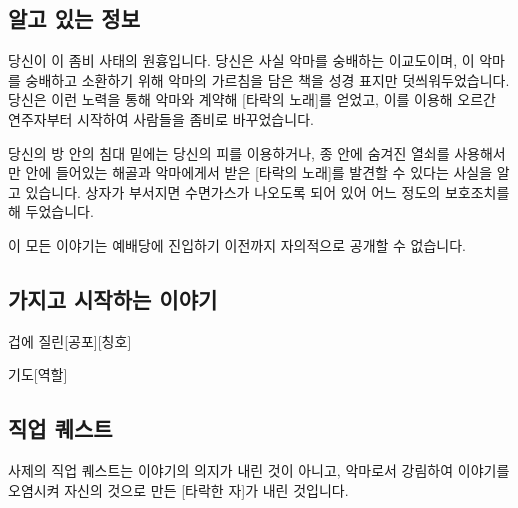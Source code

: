 \documentclass{report}
\begin{document}
	\subsection*{알고 있는 정보}
		당신이 이 좀비 사태의 원흉입니다. 당신은 사실 악마를 숭배하는 이교도이며, 이 악마를 숭배하고 소환하기 위해 악마의 가르침을 담은 책을 성경 표지만 덧씌워두었습니다. 당신은 이런 노력을 통해 악마와 계약해 [타락의 노래]를 얻었고, 이를 이용해 오르간 연주자부터 시작하여 사람들을 좀비로 바꾸었습니다.
		
		당신의 방 안의 침대 밑에는 당신의 피를 이용하거나, 종 안에 숨겨진 열쇠를 사용해서만 안에 들어있는 해골과 악마에게서 받은 [타락의 노래]를 발견할 수 있다는 사실을 알고 있습니다. 상자가 부서지면 수면가스가 나오도록 되어 있어 어느 정도의 보호조치를 해 두었습니다.
		
		이 모든 이야기는 예배당에 진입하기 이전까지 자의적으로 공개할 수 없습니다.
	
	\subsection*{가지고 시작하는 이야기}
		\begin{spoiler}{겁에 질린}{[공포][칭호]}
			
			
		\end{spoiler}
		
		\begin{spoiler}{기도}{[역할]}
		\end{spoiler}
	
	\subsection*{직업 퀘스트}
		사제의 직업 퀘스트는 이야기의 의지가 내린 것이 아니고, 악마로서 강림하여 이야기를 오염시켜 자신의 것으로 만든 [타락한 자]가 내린 것입니다.
		
\end{document}
